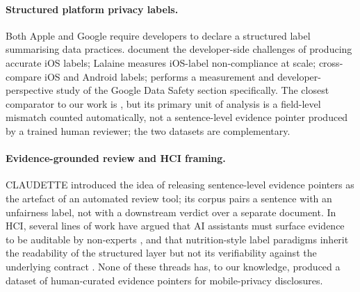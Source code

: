 \documentclass[11pt,a4paper]{article}
\begin{document}
\paragraph{Structured platform privacy labels.}
Both Apple \citep{appleprivacylabels2020} and Google
\citep{googledatasafety2022} require developers to declare a
structured label summarising data practices.
\citet{li2022understanding} document the developer-side challenges of
producing accurate iOS labels;
Lalaine \citep{xiao2023lalaine} measures iOS-label non-compliance at
scale; \citet{khandelwal2023comparing} cross-compare iOS and Android
labels; \citet{khandelwal2024unpacking} performs a measurement and
developer-perspective study of the Google Data Safety section
specifically. The closest comparator to our work is
\citet{khandelwal2024unpacking}, but its primary unit of analysis is a
field-level mismatch counted automatically, not a sentence-level
evidence pointer produced by a trained human reviewer; the two
datasets are complementary.

\paragraph{Evidence-grounded review and HCI framing.}
CLAUDETTE \citep{lippi2019claudette} introduced the idea of releasing
sentence-level evidence pointers as the artefact of an automated
review tool; its corpus pairs a sentence with an unfairness label, not
with a downstream verdict over a separate document. In HCI, several
lines of work have argued that AI assistants must surface evidence to
be auditable by non-experts
\citep{liao2020questioning,amershi2019guidelines,bansal2021does,cai2019hello},
and that nutrition-style label paradigms inherit the readability of
the structured layer but not its verifiability against the underlying
contract \citep{kelley2009nutrition,kelley2010standardizing,
schaub2015design,cranor2012necessary}. None of these threads has,
to our knowledge, produced a dataset of human-curated evidence
pointers for mobile-privacy disclosures.
\end{document}
